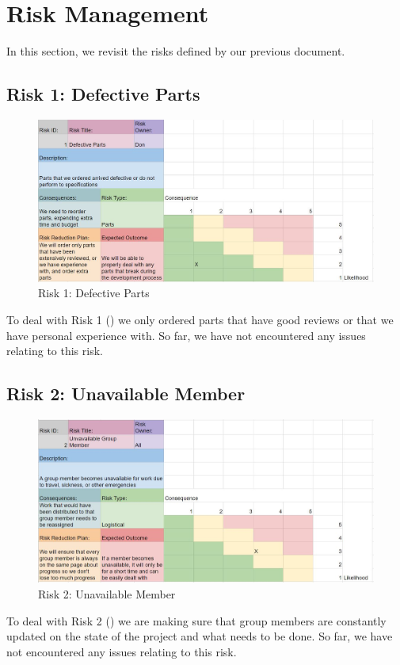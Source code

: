 
\section{Risk Management}
\label{sec:risk_management}


In this section, we revisit the risks defined by our previous document.\

\subsection{Risk 1: Defective Parts}
\begin{figure}[!ht]
\centering
\includegraphics[width=0.98\columnwidth]{risks/risk1.JPG}
\caption{Risk 1: Defective Parts}
\label{fig:risk1}
\end{figure}
To deal with Risk 1 () we only ordered parts that have good reviews or that we have personal experience with. So far, we have not encountered any issues relating to this risk.

\subsection{Risk 2: Unavailable Member}
\begin{figure}[!ht]
\centering
\includegraphics[width=0.98\columnwidth]{risks/risk2.JPG}
\caption{Risk 2: Unavailable Member}
\label{fig:risk2}
\end{figure}
To deal with Risk 2 () we are making sure that group members are constantly updated on the state of the project and what needs to be done. So far, we have not encountered any issues relating to this risk.

